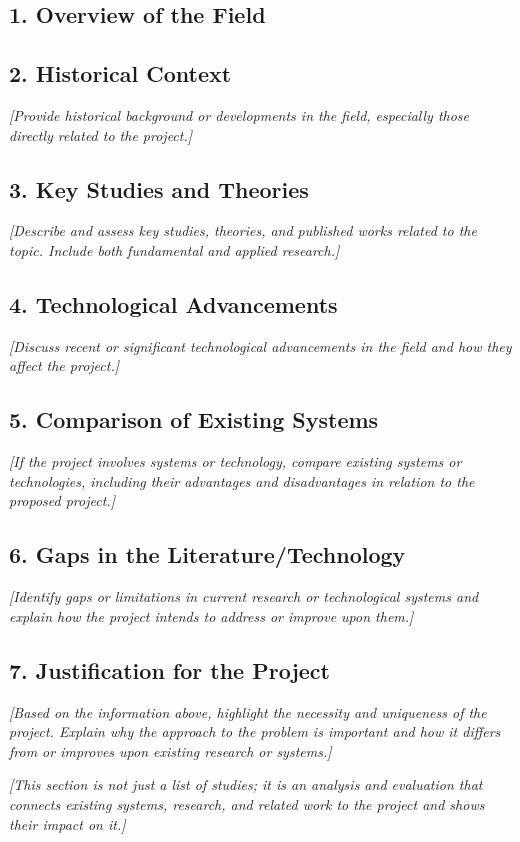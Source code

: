 \documentclass[11pt,a4paper]{article}
\newcommand{\guidance}[1]{%
  {\color{guidanceblue}\itshape [#1]\par}%
}
\begin{document}
\subsection{1. Overview of the Field}

\subsection{2. Historical Context}
\guidance{Provide historical background or developments in the field,
especially those directly related to the project.}

\subsection{3. Key Studies and Theories}
\guidance{Describe and assess key studies, theories, and published works
related to the topic. Include both fundamental and applied research.}

\subsection{4. Technological Advancements}
\guidance{Discuss recent or significant technological advancements in the
field and how they affect the project.}

\subsection{5. Comparison of Existing Systems}
\guidance{If the project involves systems or technology, compare existing
systems or technologies, including their advantages and disadvantages in
relation to the proposed project.}

\subsection{6. Gaps in the Literature/Technology}
\guidance{Identify gaps or limitations in current research or technological
systems and explain how the project intends to address or improve upon them.}

\subsection{7. Justification for the Project}
\guidance{Based on the information above, highlight the necessity and
uniqueness of the project. Explain why the approach to the problem is important
and how it differs from or improves upon existing research or systems.}
\guidance{This section is not just a list of studies; it is an analysis and
evaluation that connects existing systems, research, and related work to the
project and shows their impact on it.}
\end{document}
